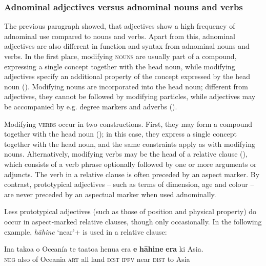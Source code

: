 \subsubsection[Adnominal adjectives versus adnominal nouns and verbs]{Adnominal adjectives versus adnominal nouns and verbs}\label{sec:3.5.1.4}
 
The previous paragraph showed, that adjectives show a high frequency of adnominal use compared to nouns and verbs. Apart from this, adnominal adjectives are also different in function and syntax from adnominal nouns and verbs. In the first place, modifying \textsc{nouns} are usually part of a compound, expressing a single concept together with the head noun, while modifying adjectives specify an additional property of the concept expressed by the head noun (). Modifying nouns are incorporated into the head noun; different from adjectives, they cannot be followed by modifying particles, while adjectives may be accompanied by e.g. degree markers and adverbs ().

Modifying \textsc{verbs} occur in two constructions. First, they may form a compound together with the head noun (); in this case, they express a single concept together with the head noun, and the same constraints apply as with modifying nouns. Alternatively, modifying verbs may be the head of a relative clause (), which consists of a verb phrase optionally followed by one or more arguments or adjuncts. The verb in a relative clause is often preceded by an aspect marker. By contrast, prototypical adjectives – such as terms of dimension, age and colour – are never preceded by an aspectual marker when used adnominally. 

  
Less prototypical adjectives (such as those of position and physical property) do occur in aspect-marked relative clauses, though only occasionally. In the following example, \textit{hāhine} ‘near’+  is used in a relative clause: 

\ea\label{ex:3.97}
\gll {\ꞌ}Ina tako{\ꞌ}a o Oceanía te ta{\ꞌ}ato{\ꞌ}a henua era \textbf{e} \textbf{hāhine} \textbf{era} ki Asia.\\
\textsc{neg} also of Oceania \textsc{art} all land \textsc{dist} \textsc{ipfv} near \textsc{dist} to Asia\\

